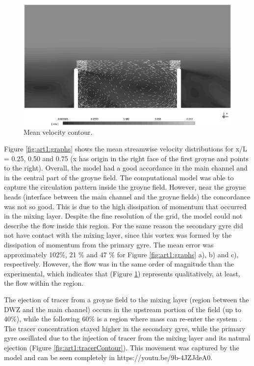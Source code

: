 \begin{figure}[!ht]
\centering
\includegraphics[width=\linewidth]{../images/art1/imgMassExchange3.png}
\caption{Mean velocity contour.}
\label{fig:art1:contour}
\end{figure}

Figure \ref{fig:art1:graphs} shows the mean streamwise velocity distributions for x/L = 0.25, 0.50 and 0.75 (x has origin in the right face of the first groyne and points to the right). Overall, the model had a good accordance in the main channel and in the central part of the groyne field. The computational model was able to capture the circulation pattern inside the groyne field. However, near the groyne heads (interface between the main channel and the groyne fields) the concordance was not so good. This is due to the high dissipation of momentum that occurred in the mixing layer. Despite the fine resolution of the grid, the model could not describe the flow inside this region. For the same reason the secondary gyre did not have contact with the mixing layer, since this vortex was formed by the dissipation of momentum from the primary gyre. The mean error was approximately 102\%, 21 \% and 47 \% for Figure \ref{fig:art1:graphs} a), b) and c), respectively. However, the flow was in the same order of magnitude than the experimental, which indicates that (Figure \ref{fig:art1:contour}) represents qualitatively, at least, the flow within the region.

The ejection of tracer from a groyne field to the mixing layer (region between the DWZ and the main channel) occurs in the upstream portion of the field (up to 40\%), while the following 60\% is a region where mass can re-enter the system \cite{weitbrecht2004}. The tracer concentration stayed higher in the secondary gyre, while the primary gyre oscillated due to the injection of tracer from the mixing layer and its natural ejection (Figure \ref{fig:art1:tracerContour}). This movement was captured by the model and can be seen completely in https://youtu.be/9b-4JZJdeA0.

